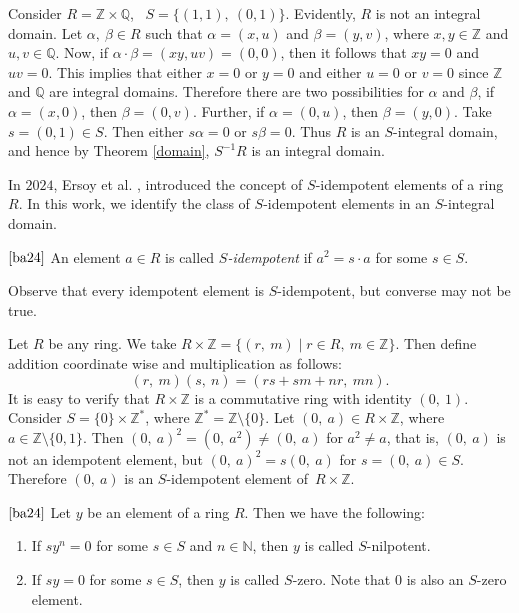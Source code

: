 \documentclass[11pt]{article}
\begin{document}
	\begin{eg}
		Consider $R=\mathbb{Z}\times \mathbb{Q}$, ~$S=\{(1,1),~ (0, 1)\}$. Evidently, $R$ is not an integral domain. Let $\alpha, ~\beta \in R$ such that $\alpha=(x, u)$ and $\beta=(y, v)$, where $x, y\in \mathbb{Z}$ and $u, v\in\mathbb{Q}$. Now, if $\alpha\cdot\beta=(xy, uv)=(0, 0)$, then it follows that $xy=0$ and $uv=0$. This implies that either $x=0$ or $y=0$ and either $u=0$ or $v=0$ since $\mathbb{Z}$ and $\mathbb{Q}$ are integral domains. Therefore there are two possibilities for $\alpha$ and $\beta$, if $\alpha=(x, 0)$, then $\beta=(0, v)$. Further, if $\alpha=(0, u)$, then $\beta=(y, 0)$. Take $s=(0,1)\in S$. Then either $s\alpha = 0$ or $s\beta = 0$. Thus $R$ is an $S$-integral domain, and hence by Theorem \ref{domain}, $S^{-1}R$ is an integral domain.
	\end{eg}
	
	
In $2024$, Ersoy et al. \cite{ba24}, introduced the concept of $S$-idempotent elements of a ring $R$. In this work, we identify the class of $S$-idempotent elements in an $S$-integral domain.
	\begin{deff}$\cite{ba24}$
		An element $a \in R$ is called \textit{$S$-idempotent} if $a^2 = s \cdot a$ for some $s \in S$. 
	\end{deff}
	Observe that every idempotent element is $S$-idempotent, but converse may not be true. 
	\begin{eg}\label{sidem}
		Let $R$ be any ring. We take $R\times \mathbb{Z}=\{(r, ~m)\mid r\in R, ~m\in \mathbb{Z}\}$. Then define addition coordinate wise and multiplication as follows: 
		$$(r, ~m)(s, ~n)=(rs+sm+nr, ~mn).$$ It is easy to verify that $R\times \mathbb{Z}$ is a commutative ring with identity $(0, ~1)$. Consider $S=\{0\}\times\mathbb{Z}^{*}$, where $\mathbb{Z}^{*}=\mathbb{Z}\setminus\{0\}$. Let $(0, ~a)\in R\times \mathbb{Z}$, where $a\in\mathbb{Z}\setminus\{0, 1\}$. Then $(0, ~a)^{2}=(0, ~a^{2})\neq (0, ~a)$ for $a^{2}\neq a$, that is, $(0, ~a)$ is not an idempotent element, but $(0, ~a)^{2}=s (0, ~a)$ for $s=(0, ~a)\in S$. Therefore $(0, ~a)$ is an $S$-idempotent element of~$R\times\mathbb{Z}$.
	\end{eg}
	\begin{deff}$\cite{ba24}$
		Let $y$ be an element of a ring $R$. Then we have the following:
		\begin{enumerate}
			\item If $sy^{n}=0$ for some $s\in S$ and $n\in \mathbb{N}$, then $y$ is called $S$-nilpotent.
			\item If $sy = 0$ for some $s\in S$, then $y$ is called $S$-zero. Note that $0$ is also an $S$-zero element.
		\end{enumerate}
	\end{deff}
    
\end{document}
